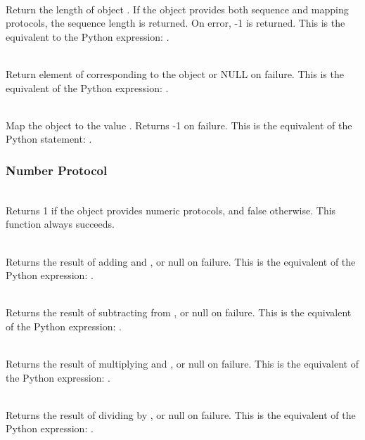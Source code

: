      \\
         Return the length of object .  If the object  provides
	 both sequence and mapping protocols, the sequence length is
	 returned. On error, -1 is returned.  This is the equivalent
	 to the Python expression: .


     \\
	 Return element of  corresponding to the object  or NULL
	 on failure. This is the equivalent of the Python expression:
	 .


     \\
	 Map the object  to the value .
	 Returns -1 on failure.  This is the equivalent
	 of the Python statement: .


\subsubsection{Number Protocol}

     \\
         Returns 1 if the object  provides numeric protocols, and
	 false otherwise. 
	 This function always succeeds.


     \\
	 Returns the result of adding  and , or null on failure.
	 This is the equivalent of the Python expression: .


     \\
	 Returns the result of subtracting  from , or null on
	 failure.  This is the equivalent of the Python expression:
	 .


     \\
	 Returns the result of multiplying  and , or null on
	 failure.  This is the equivalent of the Python expression:
	 .


     \\
	 Returns the result of dividing  by , or null on failure.
	 This is the equivalent of the Python expression: .


